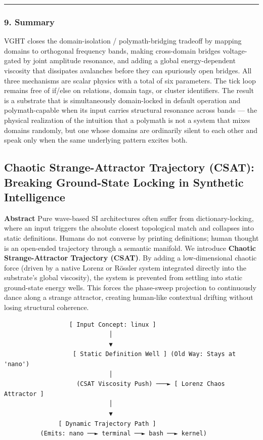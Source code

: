\documentclass[
  11pt,
  a4paper,
]{article}
\begin{document}
\begin{center}\rule{0.5\linewidth}{0.5pt}\end{center}

\subsubsection{9. Summary}\label{summary-2}

VGHT closes the domain-isolation / polymath-bridging tradeoff by mapping
domains to orthogonal frequency bands, making cross-domain bridges
voltage-gated by joint amplitude resonance, and adding a global
energy-dependent viscosity that dissipates avalanches before they can
spuriously open bridges. All three mechanisms are scalar physics with a
total of six parameters. The tick loop remains free of if/else on
relations, domain tags, or cluster identifiers. The result is a
substrate that is simultaneously domain-locked in default operation and
polymath-capable when its input carries structural resonance across
bands --- the physical realization of the intuition that a polymath is
not a system that mixes domains randomly, but one whose domains are
ordinarily silent to each other and speak only when the same underlying
pattern excites both.

\newpage

\subsection{Chaotic Strange-Attractor Trajectory (CSAT): Breaking
Ground-State Locking in Synthetic
Intelligence}\label{chaotic-strange-attractor-trajectory-csat-breaking-ground-state-locking-in-synthetic-intelligence}

\textbf{Abstract} Pure wave-based SI architectures often suffer from
dictionary-locking, where an input triggers the absolute closest
topological match and collapses into static definitions. Humans do not
converse by printing definitions; human thought is an open-ended
trajectory through a semantic manifold. We introduce \textbf{Chaotic
Strange-Attractor Trajectory (CSAT)}. By adding a low-dimensional
chaotic force (driven by a native Lorenz or Rössler system integrated
directly into the substrate's global viscosity), the system is prevented
from settling into static ground-state energy wells. This forces the
phase-sweep projection to continuously dance along a strange attractor,
creating human-like contextual drifting without losing structural
coherence.

\begin{verbatim}
                  [ Input Concept: linux ]
                             │
                             ▼
                   [ Static Definition Well ] (Old Way: Stays at 'nano')
                             │
                    (CSAT Viscosity Push) ───► [ Lorenz Chaos Attractor ]
                             │
                             ▼
               [ Dynamic Trajectory Path ]
          (Emits: nano ──► terminal ──► bash ──► kernel)
\end{verbatim}
\end{document}
